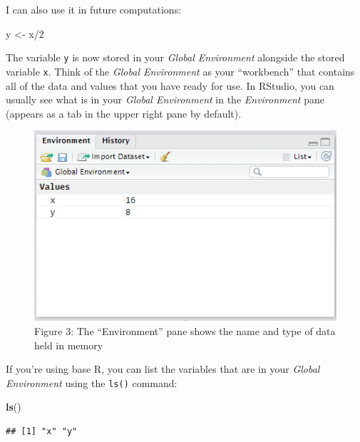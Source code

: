 \documentclass[]{book}
\newenvironment{Shaded}{\begin{snugshade}}{\end{snugshade}}
\newcommand{\KeywordTok}[1]{\textcolor[rgb]{0.13,0.29,0.53}{\textbf{{#1}}}}
\newcommand{\DecValTok}[1]{\textcolor[rgb]{0.00,0.00,0.81}{{#1}}}
\newcommand{\StringTok}[1]{\textcolor[rgb]{0.31,0.60,0.02}{{#1}}}
\newcommand{\NormalTok}[1]{{#1}}
\begin{document}
I can also use it in future computations:

\begin{Shaded}
\begin{Highlighting}[]
\NormalTok{y <-}\StringTok{ }\NormalTok{x/}\DecValTok{2}
\end{Highlighting}
\end{Shaded}

The variable \texttt{y} is now stored in your \emph{Global Environment}
alongside the stored variable \texttt{x}. Think of the \emph{Global
Environment} as your ``workbench'' that contains all of the data and
values that you have ready for use. In RStudio, you can usually see what
is in your \emph{Global Environment} in the \emph{Environment} pane
(appears as a tab in the upper right pane by default).

\begin{figure}[htbp]
\centering
\includegraphics{environment.PNG}
\caption{Figure 3: The ``Environment'' pane shows the name and type of
data held in memory}
\end{figure}

If you're using base R, you can list the variables that are in your
\emph{Global Environment} using the \texttt{ls()} command:

\begin{Shaded}
\begin{Highlighting}[]
\KeywordTok{ls}\NormalTok{()}
\end{Highlighting}
\end{Shaded}

\begin{verbatim}
## [1] "x" "y"
\end{verbatim}
\end{document}
